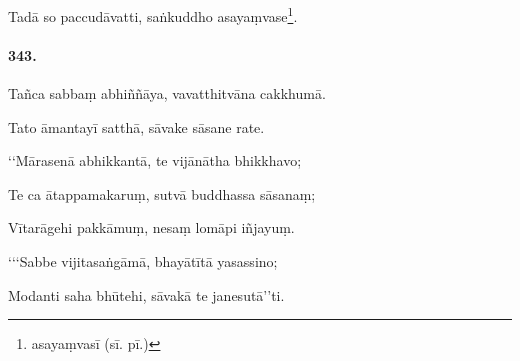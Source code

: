 Tadā so paccudāvatti, saṅkuddho asayaṃvase\footnote{asayaṃvasī (sī. pī.)}.

\paragraph{343.} Tañca sabbaṃ abhiññāya, vavatthitvāna cakkhumā.

Tato āmantayī satthā, sāvake sāsane rate.

‘‘Mārasenā abhikkantā, te vijānātha bhikkhavo;

Te ca ātappamakaruṃ, sutvā buddhassa sāsanaṃ;

Vītarāgehi pakkāmuṃ, nesaṃ lomāpi iñjayuṃ.

‘‘‘Sabbe vijitasaṅgāmā, bhayātītā yasassino;

Modanti saha bhūtehi, sāvakā te janesutā’’ti.

